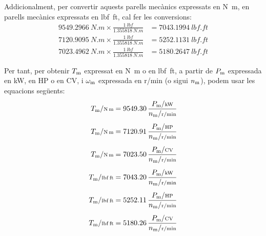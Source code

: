 Addicionalment, per  convertir aquests parells mecànics expressats en \unit{N.m}, en parells mecànics expressats en \unit{lbf.ft}, cal  fer les conversions:
\begin{subequations}
\begin{align}
    \qty{9549,2966}{N.m} \times \frac{\qty{1}{lbf}}{\qty{1,355818}{N.m}} &= \qty{7043,1994}{lbf.ft} \\[1ex]
    \qty{7120,9095}{N.m} \times \frac{\qty{1}{lbf}}{\qty{1,355818}{N.m}} &= \qty{5252,1131}{lbf.ft} \\[1ex]
    \qty{7023,4962}{N.m} \times \frac{\qty{1}{lbf}}{\qty{1,355818}{N.m}} &= \qty{5180,2647}{lbf.ft}
\end{align}
\end{subequations}

Per tant, per  obtenir $T_\mathrm{m}$ expressat en \unit{N.m} o en \unit{lbf.ft}, a partir de $P_\mathrm{m}$ expressada en kW, en HP o en CV, i $\omega_\mathrm{m}$ expressada en \unit{r/min} (o sigui $n_\mathrm{m}$),  podem usar les equacions següents:
\begin{subequations}
\begin{align}
    T\ped{m}/{\scriptstyle \unit{N.m}} &= \num{9549,30}\,  \frac{P\ped{m}/{\scriptstyle \unit{kW}}}{n\ped{m}/{\scriptstyle \unit{r/min}}} \\[1ex]
    T\ped{m}/{\scriptstyle \unit{N.m}} &= \num{7120,91}\,  \frac{P\ped{m}/{\scriptstyle \unit{HP}}}{n\ped{m}/{\scriptstyle \unit{r/min}}}\label{eq:T-N-m} \\[1ex]
    T\ped{m}/{\scriptstyle \unit{N.m}} &= \num{7023,50}\,  \frac{P\ped{m}/{\scriptstyle \unit{CV}}}{n\ped{m}/{\scriptstyle \unit{r/min}}} \\[1ex]
    T\ped{m}/{\scriptstyle \unit{lbf.ft}} &= \num{7043,20}\,  \frac{P\ped{m}/{\scriptstyle \unit{kW}}}{n\ped{m}/{\scriptstyle \unit{r/min}}} \\[1ex]
    T\ped{m}/{\scriptstyle \unit{lbf.ft}} &= \num{5252,11}\,  \frac{P\ped{m}/{\scriptstyle \unit{HP}}}{n\ped{m}/{\scriptstyle \unit{r/min}}}\label{eq:T-lbf-ft} \\[1ex]
    T\ped{m}/{\scriptstyle \unit{lbf.ft}} &= \num{5180,26}\,  \frac{P\ped{m}/{\scriptstyle \unit{CV}}}{n\ped{m}/{\scriptstyle \unit{r/min}}}
\end{align}
\end{subequations}

